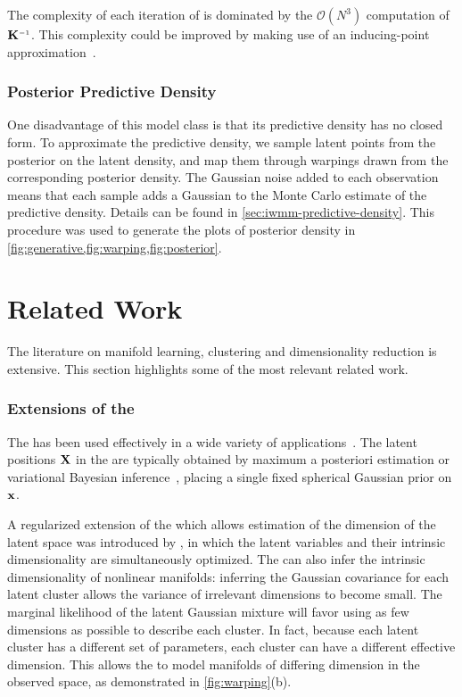 The complexity of each iteration of \HMC{} is dominated by the $\mathcal{O}(N^3)$ computation of $\vK\inv$.
This complexity could be improved by making use of an inducing-point approximation~\citep{quinonero2005unifying,snelson2006sparse}.



\subsubsection{Posterior Predictive Density}

One disadvantage of this model class is that its predictive density has no closed form.
To approximate the predictive density, we sample latent points from the posterior on the latent density, and map them through warpings drawn from the corresponding posterior density.
The Gaussian noise added to each observation means that each sample adds a Gaussian to the Monte Carlo estimate of the predictive density.
Details can be found in \cref{sec:iwmm-predictive-density}.
This procedure was used to generate the plots of posterior density in \cref{fig:generative,fig:warping,fig:posterior}.





\section{Related Work}
\label{sec:iwmm-related-work}

The literature on manifold learning, clustering and dimensionality reduction is extensive.
This section highlights some of the most relevant related work.

\subsubsection{Extensions of the \sgplvm{}}

The \gplvm{} has been used effectively in a wide variety of applications~\citep{lawrence2004gaussian,salzmann2008local,lawrence2009non}.
The latent positions $\mathbf{X}$ in the \gplvm{} are typically obtained by maximum a posteriori estimation or variational Bayesian inference~\citep{titsias2010bayesian}, placing a single fixed spherical Gaussian prior on ${\bf{x}}$.

A regularized extension of the \gplvm{} which allows estimation of the dimension of the latent space was introduced by \citet{geiger2009rank}, in which the latent variables and their intrinsic dimensionality are simultaneously optimized.
The \iwmm{} can also infer the intrinsic dimensionality of nonlinear manifolds:
inferring the Gaussian covariance for each latent cluster allows the variance of irrelevant dimensions to become small.
The marginal likelihood of the latent Gaussian mixture will favor using as few dimensions as possible to describe each cluster.
In fact, because each latent cluster has a different set of parameters, each cluster can have a different effective dimension.
This allows the \iwmm{} to model manifolds of differing dimension in the observed space, as demonstrated in \cref{fig:warping}(b).

